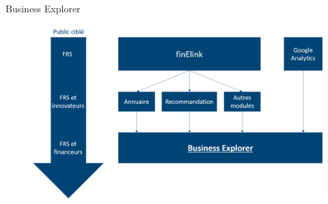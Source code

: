 \documentclass[10pt]{beamer}
\begin{document}
		\begin{frame}{Business Explorer}
		 \begin{figure}\includegraphics[width=\linewidth]{resources/businessexplorer.png}\end{figure}
		\end{frame}
			
\end{document}
